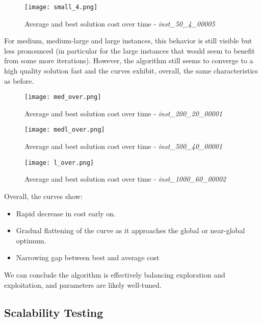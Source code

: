 \documentclass{article}
\begin{document}
\begin{figure}[H]
    \centering
    \texttt{[image: small\_4.png]}
    \caption{Average and best solution cost over time - \textit{inst\_50\_4\_00005}}
    \label{fig:enter-label}
\end{figure}

For medium, medium-large and large instances, this behavior is still visible but less pronounced (in particular for the large instances that would seem to benefit from some more iterations). However, the algorithm still seems to converge to a high quality solution fast and the curves exhibit, overall, the same characteristics as before. 

\begin{figure}[H]
    \centering
    \texttt{[image: med\_over.png]}
    \caption{Average and best solution cost over time - \textit{inst\_200\_20\_00001}}
    \label{fig:enter-label}
\end{figure}

\begin{figure}[H]
    \centering
    \texttt{[image: medl\_over.png]}
    \caption{Average and best solution cost over time - \textit{inst\_500\_40\_00001}}
    \label{fig:enter-label}
\end{figure}


\begin{figure}[H]
    \centering
    \texttt{[image: l\_over.png]}
    \caption{Average and best solution cost over time - \textit{inst\_1000\_60\_00002}}
    \label{fig:enter-label}
\end{figure}

Overall, the curves show:
\begin{itemize}
    \item Rapid decrease in cost early on.
    \item Gradual flattening of the curve as it approaches the global or near-global optimum.
    \item Narrowing gap between best and average cost
\end{itemize}

We can conclude the algorithm is effectively balancing exploration and exploitation, and parameters are likely well-tuned.

\subsection{Scalability Testing}
\end{document}
